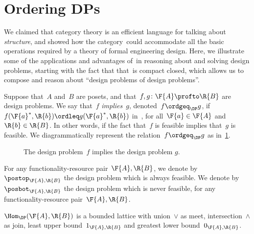 

\section{Ordering DPs}\label{sec:ordering-order}
We claimed that category theory is an efficient language for talking about \emph{structure}, and showed how the category~\DP could accommodate all the basic operations required by a theory of formal engineering design. Here, we illustrate some of the applications and advantages of~\DP in reasoning about and solving design problems, starting with the fact that that~\DP is compact closed, which allows us to compose and reason about ``design problems of design problems''.

\begin{definition}[Order on~\DP]
  \label{def:DP_loc_pos}

  Suppose that~$A$ and~$B$ are posets, and that~$f,g \colon \F{A} \profto \R{B}$ are design problems. We say that~$f$ \emph{implies}~$g$, denoted~$f \ordgeq_{\DP} g$, if~$f(\F{a}^*,\R{b}) \ordleq g(\F{a}^*,\R{b} )$ in~\Bool, for all~$\F{a} \in \F{A}$
  and~$\R{b} \in \R{B}$. In other words, if the fact that~$f$ is feasible implies that~$g$ is feasible. We diagrammatically represent the relation~$f \ordgeq_{\DP} g$ as in~\cref{fig:dpimplies}.
\end{definition}

\begin{figure}[h!]
  \begin{center}
  \end{center}
  \caption{The design problem~$f$ implies the design problem $g$. \label{fig:dpimplies}}
\end{figure}

\begin{remark}
  For any functionality-resource pair~$\F{A},\R{B}$, we denote by~$\postop_{\F{A},\R{B}}$ the design problem which is always feasible. We denote by~$\posbot_{\F{A},\R{B}}$ the design problem which is never feasible, for any functionality-resource pair~$\F{A},\R{B}$.
\end{remark}
\begin{lemma}
  \label{lem:dpboundedlattice}
  $\Hom_\DP(\F{A},\R{B})$ is a bounded lattice with union~$\vee$ as meet, intersection~$\wedge$ as join, least upper bound~$1_{\F{A},\R{B}}$ and greatest lower bound~$0_{\F{A},\R{B}}$.
\end{lemma}

